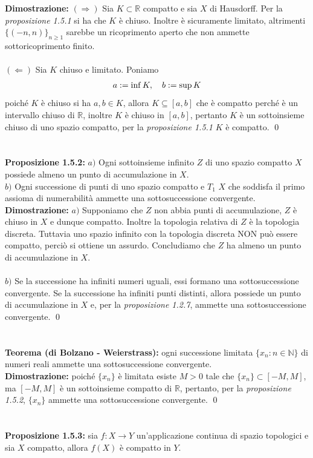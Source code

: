 \documentclass{article}
\begin{document}
\textbf{Dimostrazione:} $(\Rightarrow)$ Sia $K \subset \mathbb{R}$ compatto e sia $X$ di Hausdorff. Per la \textit{proposizione 1.5.1} si ha che $K$ è chiuso. Inoltre è sicuramente limitato, altrimenti $\{ (-n, n) \}_{n \geq 1}$ sarebbe un ricoprimento aperto che non ammette sottoricoprimento finito. \\ \\
$(\Leftarrow)$ Sia $K$ chiuso e limitato. Poniamo
\begin{gather}
    a := \inf K, \quad b := \sup K \notag
\end{gather}
poiché $K$ è chiuso si ha $a, b \in K$, allora $K \subseteq [a, b]$ che è compatto perché è un intervallo chiuso di $\mathbb{R}$, inoltre $K$ è chiuso in $[a, b]$, pertanto $K$ è un sottoinsieme chiuso di uno spazio compatto, per la \textit{proposizione 1.5.1} $K$ è compatto. \qed \\ \\ \\
\textbf{Proposizione 1.5.2:} $a)$ Ogni sottoinsieme infinito $Z$ di uno spazio compatto $X$ possiede almeno un punto di accumulazione in $X$. \\
$b)$ Ogni successione di punti di uno spazio compatto e $T_1$ $X$ che soddisfa il primo assioma di numerabilità ammette una sottosuccessione convergente. \\

\textbf{Dimostrazione:} $a)$ Supponiamo che $Z$ non abbia punti di accumulazione, $Z$ è chiuso in $X$ e dunque compatto. Inoltre la topologia relativa di $Z$ è la topologia discreta. Tuttavia uno spazio infinito con la topologia discreta NON può essere compatto, perciò si ottiene un assurdo. Concludiamo che $Z$ ha almeno un punto di accumulazione in $X$. \\ \\
$b)$ Se la successione ha infiniti numeri uguali, essi formano una sottosuccessione convergente. Se la successione ha infiniti punti distinti, allora possiede un punto di accumulazione in $X$ e, per la \textit{proposizione 1.2.7}, ammette una sottosuccessione convergente. \qed \\ \\ \\
\textbf{Teorema (di Bolzano - Weierstrass):} ogni successione limitata $\{ x_n : n \in \mathbb{N} \}$ di numeri reali ammette una sottosuccessione convergente. \\

\textbf{Dimostrazione:} poiché $\{ x_n \}$ è limitata esiste $M > 0$ tale che $\{ x_n \} \subset [-M, M]$, ma $[-M, M]$ è un sottoinsieme compatto di $\mathbb{R}$, pertanto, per la \textit{proposizione 1.5.2}, $\{ x_n \}$ ammette una sottosuccessione convergente. \qed \\ \\ \\
\textbf{Proposizione 1.5.3:} sia $f : X \longrightarrow Y$ un'applicazione continua di spazio topologici e sia $X$ compatto, allora $f(X)$ è compatto in $Y$. \\
\end{document}
